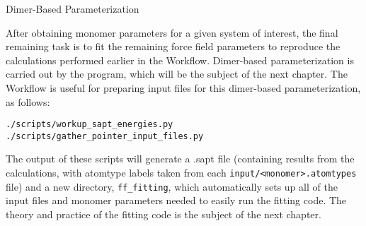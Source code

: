 
\begin{section}{Dimer-Based Parameterization}

After obtaining monomer parameters for a given system of interest, the final
remaining task is to fit the remaining force field parameters to reproduce the
\dftsapt calculations performed earlier in the Workflow. Dimer-based
parameterization is carried out by the \pointer program, which will be the
subject of the next chapter. The Workflow is useful for preparing input
files for this dimer-based parameterization, as follows:
%
\begin{lstlisting}
./scripts/workup_sapt_energies.py
./scripts/gather_pointer_input_files.py
\end{lstlisting}
%
The output of these scripts will generate a .sapt file (containing results
from the \dftsapt calculations, with atomtype
labels taken from each \verb|input/<monomer>.atomtypes| file) and a new
directory, \verb|ff_fitting|, which automatically sets up all of the input files and monomer
parameters needed to easily run the \pointer fitting code. The theory and
practice of the \pointer fitting code is the subject of the next chapter.

\end{section}
